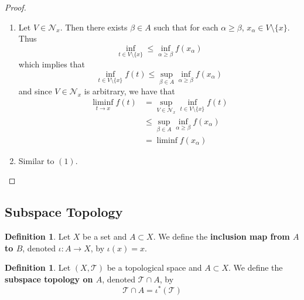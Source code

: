 \documentclass[12pt]{amsart}
\theoremstyle{definition}
\newtheorem{defn}[definition]{Definition}
\newcommand{\al}{\alpha}
\newcommand{\MN}{\mathcal{N}}
\newcommand{\MT}{\mathcal{T}}
\newcommand{\tbf}[1]{\textbf{#1}}
\DeclareMathOperator*{\0}{\mbf{0}}
\DeclareMathOperator*{\1}{\mbf{1}}
\begin{document}
	\begin{proof}\
		\begin{enumerate}
			\item Let $V \in \MN_{x}$. Then there exists $\beta \in A$ such that for each $\al \geq \beta$, $x_{\al} \in V \setminus \{x\}$. Thus 
			$$\inf_{t \in V \setminus \{x\}} \leq \inf_{\al \geq \beta}f(x_{\al})$$
			which implies that $$\inf_{t \in V \setminus \{x\}} f(t)  \leq \sup_{\beta \in A} \inf_{\al \geq \beta} f(x_{\al})$$
			and since $V \in \MN_x$ is arbitrary, we have that
			\begin{align*}
				\liminf_{t \rightarrow x} f(t) 
				&= \sup_{V \in \MN_{x}} \inf_{t \in V \setminus \{x\}} f(t) \\
				& \leq \sup_{\beta \in A} \inf_{\al \geq \beta} f(x_{\al}) \\
				&= \liminf f(x_{\al})
			\end{align*} 
			\item Similar to $(1)$.
		\end{enumerate}
	\end{proof}































\newpage
\subsection{Subspace Topology}

\begin{defn}
	Let $X$ be a set and $A \subset X$. We define the \tbf{inclusion map from $A$ to $B$}, denoted $\iota: A \rightarrow X$, by $\iota(x) = x$. 
\end{defn}

\begin{defn}
	Let $(X, \MT)$ be a topological space and $A \subset X$. We define the \tbf{subspace topology on $A$}, denoted $\MT \cap A$, by $$\MT \cap A = \iota^*(\MT)$$
\end{defn}
\end{document}
